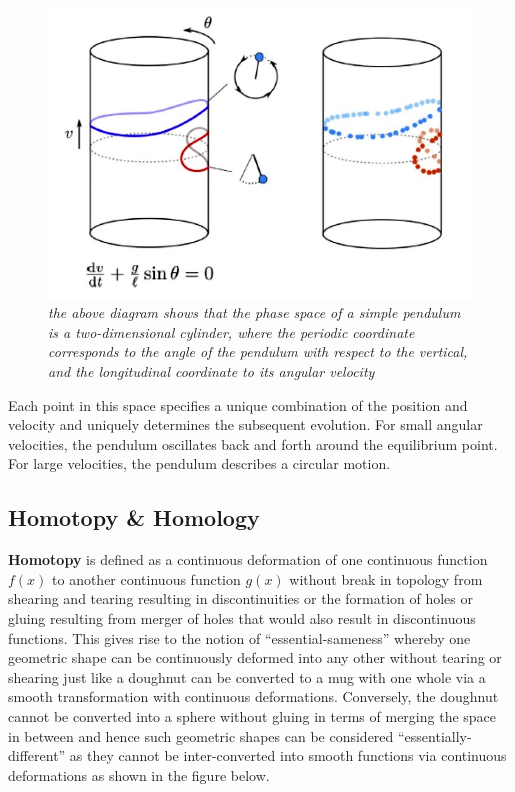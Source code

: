 \begin{figure}
	\centering
	\includegraphics[width=\linewidth]{images/03_Phase Space Projections.jpg}
	\caption{\textit{the above diagram shows that the phase space of a simple pendulum is a two-dimensional cylinder, where the periodic coordinate corresponds to the angle  of the pendulum with respect to the vertical, and the longitudinal coordinate to its angular velocity}}
	\label{fig:fig2}
\end{figure}

Each point in this space specifies a unique combination of the position and velocity and uniquely determines the subsequent evolution. For small angular velocities, the pendulum oscillates back and forth around the equilibrium point. For large velocities, the pendulum describes a circular motion.

\subsection{Homotopy \& Homology}

\textbf{Homotopy} \cite{03.1_2009simplicialHomotopy} \cite{08.1_2003SimplicialHomology} is defined as  a continuous deformation of one continuous function $f(x)$ to another continuous function $g(x)$ without break in topology from shearing and  tearing resulting in discontinuities or the formation of holes or gluing resulting from merger of holes that would also result in discontinuous functions. This gives rise to the notion of “essential-sameness” whereby one geometric shape can be continuously deformed into any other without tearing or shearing just like a doughnut can be converted to a mug with one whole via a smooth transformation with continuous deformations. Conversely, the doughnut cannot be converted into a sphere without gluing in terms of merging the space in between and hence such geometric shapes can be considered “essentially-different” as they cannot be inter-converted into smooth functions via continuous deformations as shown in the figure below.\cite{07_bjorner2003Homotopy}

